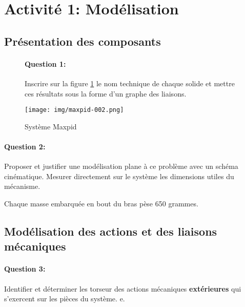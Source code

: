 

\section{Activité 1: Modélisation}

\subsection{Présentation des composants}

\begin{figure}[!h]
 \begin{minipage}{0.45\linewidth}
\paragraph{Question 1:} Inscrire sur la figure \ref{img1} le nom technique de chaque solide et mettre ces résultats sous la forme d'un graphe des liaisons.
 \end{minipage}
  \hfill
 \begin{minipage}{0.45\linewidth}
  \centering\texttt{[image: img/maxpid-002.png]}
  \caption{Système Maxpid}
  \label{img1}
 \end{minipage}
\end{figure}

\paragraph{Question 2:} Proposer et justifier une modélisation plane à ce problème avec un schéma cinématique. Mesurer directement sur le système les dimensions utiles du mécanisme.

\vspace{6cm}

Chaque \og masse \fg embarquée en bout du bras pèse 650 grammes.

\subsection{Modélisation des actions et des liaisons mécaniques}

\paragraph{Question 3:} Identifier et déterminer les torseur des actions mécaniques \textbf{extérieures} qui s'exercent sur les pièces du système. e.




